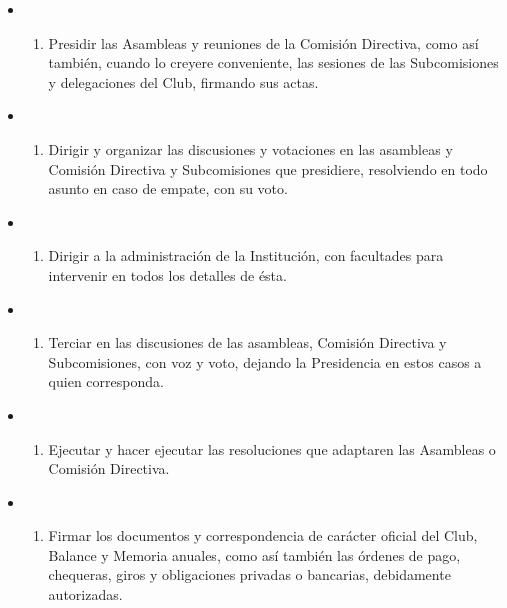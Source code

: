 \documentclass[openany]{book}
\providecommand{\tightlist}{%
  \setlength{\itemsep}{0pt}\setlength{\parskip}{0pt}}
\begin{document}
\begin{itemize}
  \begin{itemize}
  \item
    \begin{enumerate}
    \def\labelenumi{\alph{enumi})}
    \tightlist
    \item
      Presidir las Asambleas y reuniones de la Comisión Directiva, como así también, cuando lo creyere conveniente, las sesiones de las Subcomisiones y delegaciones del Club, firmando sus actas.
    \end{enumerate}
  \item
    \begin{enumerate}
    \def\labelenumi{\alph{enumi})}
    \setcounter{enumi}{1}
    \tightlist
    \item
      Dirigir y organizar las discusiones y votaciones en las asambleas y Comisión Directiva y Subcomisiones que presidiere, resolviendo en todo asunto en caso de empate, con su voto.
    \end{enumerate}
  \item
    \begin{enumerate}
    \def\labelenumi{\alph{enumi})}
    \setcounter{enumi}{2}
    \tightlist
    \item
      Dirigir a la administración de la Institución, con facultades para intervenir en todos los detalles de ésta.
    \end{enumerate}
  \item
    \begin{enumerate}
    \def\labelenumi{\alph{enumi})}
    \setcounter{enumi}{3}
    \tightlist
    \item
      Terciar en las discusiones de las asambleas, Comisión Directiva y Subcomisiones, con voz y voto, dejando la Presidencia en estos casos a quien corresponda.
    \end{enumerate}
  \item
    \begin{enumerate}
    \def\labelenumi{\alph{enumi})}
    \setcounter{enumi}{4}
    \tightlist
    \item
      Ejecutar y hacer ejecutar las resoluciones que adaptaren las Asambleas o Comisión Directiva.
    \end{enumerate}
  \item
    \begin{enumerate}
    \def\labelenumi{\alph{enumi})}
    \setcounter{enumi}{5}
    \tightlist
    \item
      Firmar los documentos y correspondencia de carácter oficial del Club, Balance y Memoria anuales, como así también las órdenes de pago, chequeras, giros y obligaciones privadas o bancarias, debidamente autorizadas.

\end{enumerate}
\end{itemize}
\end{itemize}
\end{document}
